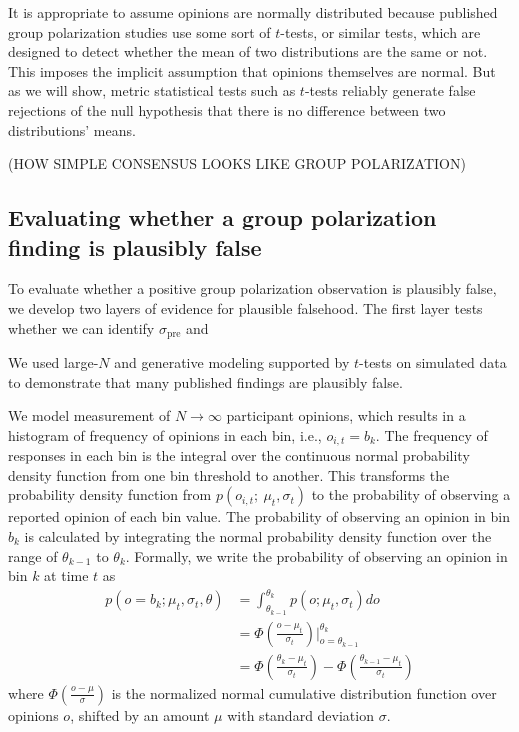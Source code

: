\documentclass[11pt, letterpaper]{article}
\newcommand{\sigmapre}{\sigma_\mathrm{pre}}
\begin{document}
It is appropriate to assume opinions are normally distributed because published
group polarization studies use some sort of $t$-tests, or similar tests, which are designed
to detect whether the mean of two distributions are the same or not. This imposes the
implicit assumption that opinions themselves are normal. But as we will show, 
metric statistical tests such as $t$-tests reliably generate false rejections
of the null hypothesis that there is no difference between two distributions' means.

(HOW SIMPLE CONSENSUS LOOKS LIKE GROUP POLARIZATION)


\subsection{Evaluating whether a group polarization finding is plausibly false}

To evaluate whether a positive group polarization observation is plausibly false,
we develop two layers of evidence for plausible falsehood. The first layer
tests whether we can identify $\sigmapre$ and 

We used large-$N$ and generative modeling supported by $t$-tests on simulated
data to demonstrate that many published findings are plausibly false. 

We model measurement of $N \to \infty$ participant opinions,
which results in a histogram of frequency of opinions
in each bin, i.e., $o_{i,t} = b_k$. The frequency of responses in each bin is 
the integral over the continuous normal probability density function from 
one bin threshold to another. This transforms the probability density 
function from $p(o_{i,t};~\mu_t, \sigma_t)$ to the probability
of observing a reported opinion of each bin value. 
The probability of observing an opinion in bin
$b_k$ is calculated by integrating the normal probability density 
function over the range of $\theta_{k-1}$ to $\theta_{k}$. 
Formally, we write the 
probability of observing an opinion in bin $k$ at time $t$ as
\begin{equation}
\begin{aligned}
  p(o = b_k;\mu_t, \sigma_t, \theta) 
    &= \int_{\theta_{k-1}}^{\theta_k} p(o;\mu_t, \sigma_t) do \\
    &= \Phi \left( \frac{o - \mu_t}{\sigma_t} \right)\Big|_{o=\theta_{k-1}}^{\theta_k} \\
    &= \Phi \left( \frac{\theta_k - \mu_t}{\sigma_t} \right) - 
       \Phi \left( \frac{\theta_{k-1} - \mu_t}{\sigma_t} \right)
\end{aligned}
\label{eq:binFrequency}
\end{equation}
\noindent
where $\Phi(\frac{o - \mu}{\sigma})$ is the normalized 
normal cumulative distribution function over opinions $o$, shifted by an amount $\mu$ with
standard deviation $\sigma$.
\end{document}
